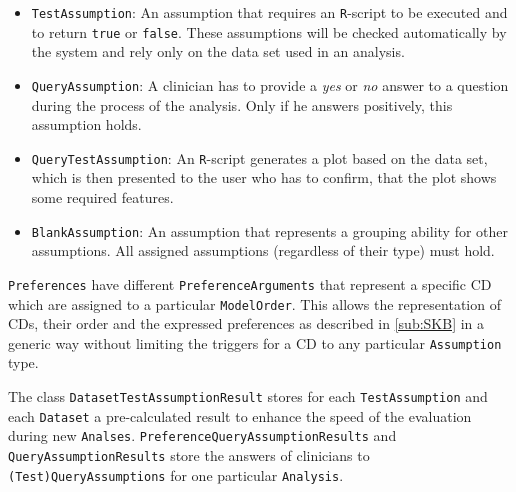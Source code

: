 \begin{itemize}

	\item \texttt{TestAssumption}: An assumption that requires an \texttt{R}-script to be executed and to return \texttt{true} or \texttt{false}. These assumptions will be checked automatically by the system and rely only on the data set used in an analysis.
	\item \texttt{QueryAssumption}: A clinician has to provide a \textit{yes} or \textit{no} answer to a question during the process of the analysis. Only if he answers positively, this assumption holds.
	\item \texttt{QueryTestAssumption}: An \texttt{R}-script generates a plot based on the data set, which is then presented to the user who has to confirm, that the plot shows some required features.
	\item \texttt{BlankAssumption}: An assumption that represents a grouping ability for other assumptions. All assigned assumptions (regardless of their type) must hold. 
\end{itemize}
\bigskip


\texttt{Preferences} have different \texttt{PreferenceArguments} that represent a specific \gls{CD} which are assigned to a particular \texttt{ModelOrder}. This allows the representation of \glspl{CD}, their order and the expressed preferences as described in \autoref{sub:SKB} in a generic way without limiting the triggers for a \gls{CD} to any particular \texttt{Assumption} type. 

The class \texttt{DatasetTestAssumptionResult} stores for each \texttt{TestAssumption} and each \texttt{Dataset} a pre-calculated result to enhance the speed of the evaluation during new \texttt{Analses}. \texttt{PreferenceQueryAssumptionResults} and \texttt{QueryAssumptionResults} store the answers of clinicians to \texttt{(Test)QueryAssumptions} for one particular \texttt{Analysis}.

